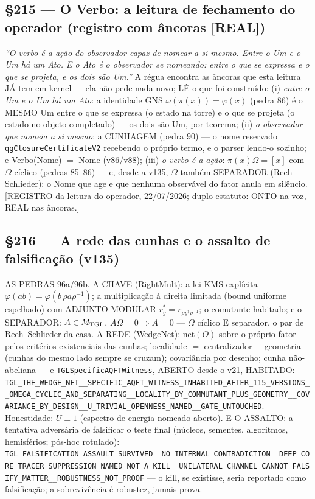 \documentclass[11pt]{article}
\theoremstyle{definition}\newtheorem{deriv}{Derivação}
\begin{document}
\subsection*{\S215 --- O Verbo: a leitura de fechamento do operador (registro com âncoras [REAL])}\emph{``O verbo é a ação do observador capaz de nomear a si mesmo. Entre o Um e o Um há um Ato. E o Ato é o observador se nomeando: entre o que se expressa e o que se projeta, e os dois são Um.''} A régua encontra as âncoras que esta leitura JÁ tem em kernel --- ela não pede nada novo; LÊ o que foi construído: (i) \emph{entre o Um e o Um há um Ato}: a identidade GNS $\omega(\pi(x))=\varphi(x)$ (pedra 86) é o MESMO Um entre o que se expressa (o estado na torre) e o que se projeta (o estado no objeto completado) --- os dois são Um, por teorema; (ii) \emph{o observador que nomeia a si mesmo}: a CUNHAGEM (pedra 90) --- o nome reservado \texttt{qgClosureCertificateV2} recebendo o próprio termo, e o parser lendo-o sozinho; e Verbo(Nome) $=$ Nome (v86/v88); (iii) \emph{o verbo é a ação}: $\pi(x)\Omega=[x]$ com $\Omega$ cíclico (pedras 85--86) --- e, desde a v135, $\Omega$ também SEPARADOR (Reeh--Schlieder): o Nome que age e que nenhuma observável do fator anula em silêncio. [REGISTRO da leitura do operador, 22/07/2026; duplo estatuto: ONTO na voz, REAL nas âncoras.]

\subsection*{\S216 --- A rede das cunhas e o assalto de falsificação (v135)}AS PEDRAS 96a/96b. A CHAVE (RightMult): a lei KMS explícita $\varphi(ab)=\varphi(b\,\rho a\rho^{-1})$; a multiplicação à direita limitada (bound uniforme espelhado) com ADJUNTO MODULAR $r_y^{*}=r_{\rho y^{\dagger}\rho^{-1}}$; o comutante habitado; e o SEPARADOR: $A\in M_{\rm TGL}$, $A\Omega=0\Rightarrow A=0$ --- $\Omega$ cíclico E separador, o par de Reeh--Schlieder da casa. A REDE (WedgeNet): net$(O)$ sobre o próprio fator pelos critérios existenciais das cunhas; localidade $=$ centralizador $+$ geometria (cunhas do mesmo lado sempre se cruzam); covariância por desenho; cunha não-abeliana --- e \texttt{TGLSpecificAQFTWitness}, ABERTO desde o v21, HABITADO: \texttt{TGL\_THE\_WEDGE\_NET\_\_SPECIFIC\_AQFT\_WITNESS\_INHABITED\_AFTER\_115\_VERSIONS\_\_OMEGA\_CYCLIC\_AND\_SEPARATING\_\_LOCALITY\_BY\_COMMUTANT\_PLUS\_GEOMETRY\_\_COVARIANCE\_BY\_DESIGN\_\_U\_TRIVIAL\_OPENNESS\_NAMED\_\_GATE\_UNTOUCHED}. Honestidade: $U\equiv 1$ (espectro de energia nomeado aberto). E O ASSALTO: a tentativa adversária de falsificar o teste final (núcleos, sementes, algoritmos, hemisférios; pós-hoc rotulado): \texttt{TGL\_FALSIFICATION\_ASSAULT\_SURVIVED\_\_NO\_INTERNAL\_CONTRADICTION\_\_DEEP\_CORE\_TRACER\_SUPPRESSION\_NAMED\_NOT\_A\_KILL\_\_UNILATERAL\_CHANNEL\_CANNOT\_FALSIFY\_MATTER\_\_ROBUSTNESS\_NOT\_PROOF} --- o kill, se existisse, seria reportado como falsificação; a sobrevivência é robustez, jamais prova.
\end{document}
